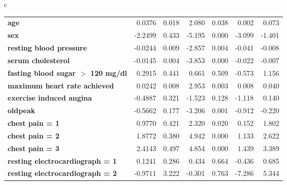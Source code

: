 \begin{table*}[!tp]
{{\begin{tabular}{c}
\begin{tabular*}{\textwidth}{l  @{\extracolsep{\fill}} rrrrrr}
        \textbf{age}                               &       0.0376  &        0.018     &     2.080  &         0.038        &        0.002    &        0.073     \\
        \textbf{sex}                               &      -2.2499  &        0.433     &    -5.195  &         0.000        &       -3.099    &       -1.401     \\
        \textbf{resting blood pressure}            &      -0.0244  &        0.009     &    -2.857  &         0.004        &       -0.041    &       -0.008     \\
        \textbf{serum cholesterol}                 &      -0.0145  &        0.004     &    -3.853  &         0.000        &       -0.022    &       -0.007     \\
        \textbf{fasting blood sugar $>$ 120 mg/dl} &       0.2915  &        0.441     &     0.661  &         0.509        &       -0.573    &        1.156     \\
        \textbf{maximum heart rate achieved}       &       0.0242  &        0.008     &     2.953  &         0.003        &        0.008    &        0.040     \\
        \textbf{exercise induced angina}           &      -0.4887  &        0.321     &    -1.523  &         0.128        &       -1.118    &        0.140     \\
        \textbf{oldpeak}                           &      -0.5662  &        0.177     &    -3.206  &         0.001        &       -0.912    &       -0.220     \\
        \textbf{chest pain = 1}                    &       0.9770  &        0.421     &     2.320  &         0.020        &        0.152    &        1.802     \\
        \textbf{chest pain = 2}                    &       1.8772  &        0.380     &     4.942  &         0.000        &        1.133    &        2.622     \\
        \textbf{chest pain = 3}                    &       2.4143  &        0.497     &     4.854  &         0.000        &        1.439    &        3.389     \\
        \textbf{resting electrocardiograph = 1}    &       0.1241  &        0.286     &     0.434  &         0.664        &       -0.436    &        0.685     \\
        \textbf{resting electrocardiograph = 2}    &      -0.9711  &        3.222     &    -0.301  &         0.763        &       -7.286    &        5.344     \\

\end{tabular*}
\end{tabular}}}
\end{table*}
